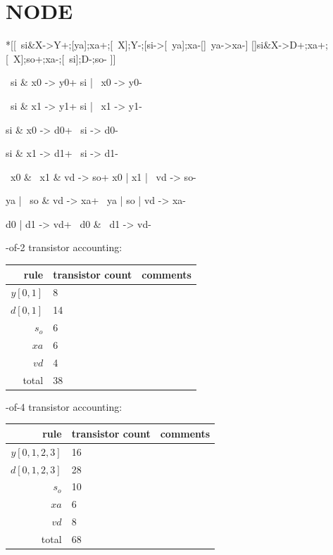 \documentclass{article}
\begin{document}
\section{NODE \label{sec:DESERIAL_CHAIN_NODE}}

\begin{hse}
*[[~si&X->Y+;[ya];xa+;[~X];Y-;[si->[~ya];xa-[]~ya->xa-]
  []si&X->D+;xa+;[~X];so+;xa-;[~si];D-;so-
 ]]
\end{hse}

\begin{prs2}
~si & x0 -> y0+
si | ~x0 -> y0-

~si & x1 -> y1+
si | ~x1 -> y1-
\end{prs2}

\begin{prs2}
si & x0 -> d0+
~si -> d0-

si & x1 -> d1+
~si -> d1-
\end{prs2}

\begin{prs2}
~x0 & ~x1 & vd -> so+
x0 | x1 | ~vd -> so-
\end{prs2}

\begin{prs2}
ya | ~so & vd -> xa+
~ya | so | vd -> xa-
\end{prs2}

\begin{prs2}
d0 | d1 -> vd+
~d0 & ~d1 -> vd-
\end{prs2}

-of-2 transistor accounting:

\begin{center}
    \begin{tabular}{|r|l|l|}
    \hline
    rule & transistor count & comments \\ \hline
    $y[0,1]$ & 8 & \\ \hline
    $d[0,1]$ & 14 & \\ \hline
    $s_o$ & 6 & \\ \hline
    $xa$ & 6 & \\ \hline
    $vd$ & 4 & \\ \hline
    \hline total & 38 & \\ \hline
    \end{tabular}
\end{center}

-of-4 transistor accounting:

\begin{center}
    \begin{tabular}{|r|l|l|}
    \hline
    rule & transistor count & comments \\ \hline
    $y[0,1,2,3]$ & 16 & \\ \hline
    $d[0,1,2,3]$ & 28 & \\ \hline
    $s_o$ & 10 & \\ \hline
    $xa$ & 6 & \\ \hline
    $vd$ & 8 & \\ \hline
    \hline total & 68 & \\ \hline
    \end{tabular}
\end{center}
\end{document}
